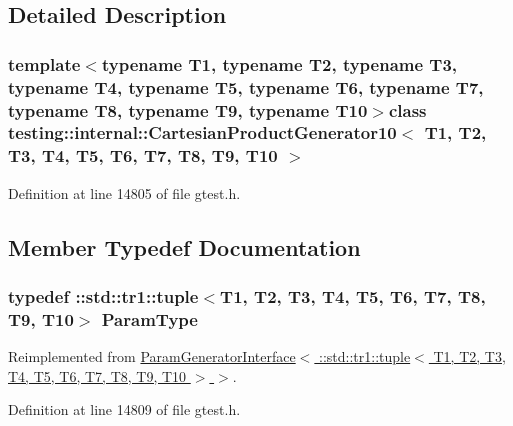\subsection{\-Detailed \-Description}
\subsubsection*{template$<$typename T1, typename T2, typename T3, typename T4, typename T5, typename T6, typename T7, typename T8, typename T9, typename T10$>$class testing\-::internal\-::\-Cartesian\-Product\-Generator10$<$ T1, T2, T3, T4, T5, T6, T7, T8, T9, T10 $>$}



\-Definition at line 14805 of file gtest.\-h.



\subsection{\-Member \-Typedef \-Documentation}
\hypertarget{classtesting_1_1internal_1_1CartesianProductGenerator10_adffde37eb66ea6d9917ab9fd24b46926}{
\subsubsection[{\-Param\-Type}]{\setlength{\rightskip}{0pt plus 5cm}typedef \-::{\bf std\-::tr1\-::tuple}$<$\-T1, \-T2, \-T3, \-T4, \-T5, \-T6, \-T7, \-T8, \-T9, \-T10$>$ {\bf \-Param\-Type}}}\label{d9/df4/classtesting_1_1internal_1_1CartesianProductGenerator10_adffde37eb66ea6d9917ab9fd24b46926}


\-Reimplemented from \hyperlink{classtesting_1_1internal_1_1ParamGeneratorInterface_a1c17d95e5946c3f940ece2bd9165fc34}{\-Param\-Generator\-Interface$<$ \-::std\-::tr1\-::tuple$<$ T1, T2, T3, T4, T5, T6, T7, T8, T9, T10 $>$ $>$}.



\-Definition at line 14809 of file gtest.\-h.



